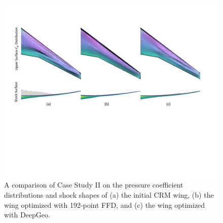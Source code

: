 \begin{figure}[!t]
    \begin{center}
        \includegraphics[width=1\linewidth]{chapter5/fig/crm_optim_cp.pdf}
    \end{center}
    \caption{
        \small A comparison of Case Study II on the pressure coefficient distributions and shock shapes of (a) the initial CRM wing, (b) the wing optimized with 192-point FFD, and (c) the wing optimized with DeepGeo.
    }
    \label{ch5:fig:cs2_cp}
\end{figure}

